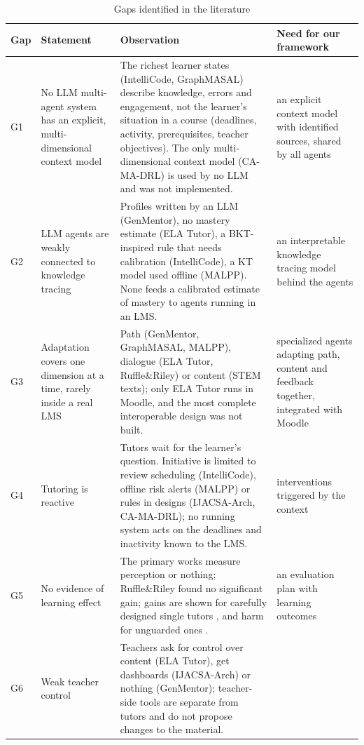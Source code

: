 \begin{table}[htbp]
\centering
\caption{Gaps identified in the literature}
\label{tab-gaps}
\scriptsize
\begin{tabularx}{\textwidth}{@{}L{0.7cm}L{3.3cm}YL{3.0cm}@{}}
\toprule
\textbf{Gap} & \textbf{Statement} & \textbf{Observation} & \textbf{Need for our framework} \\
\midrule
G1 & No LLM multi-agent system has an explicit, multi-dimensional context model &
  The richest learner states (IntelliCode, GraphMASAL) describe knowledge, errors and engagement, not the learner's situation in a course (deadlines, activity, prerequisites, teacher objectives). The only multi-dimensional context model (CA-MA-DRL) is used by no LLM and was not implemented. &
  an explicit context model with identified sources, shared by all agents \\
G2 & LLM agents are weakly connected to knowledge tracing &
  Profiles written by an LLM (GenMentor), no mastery estimate (ELA Tutor), a BKT-inspired rule that needs calibration (IntelliCode), a KT model used offline (MALPP). None feeds a calibrated estimate of mastery to agents running in an LMS. &
  an interpretable knowledge tracing model behind the agents \\
G3 & Adaptation covers one dimension at a time, rarely inside a real LMS &
  Path (GenMentor, GraphMASAL, MALPP), dialogue (ELA Tutor, Ruffle\&Riley) or content (STEM texts); only ELA Tutor runs in Moodle, and the most complete interoperable design was not built. &
  specialized agents adapting path, content and feedback together, integrated with Moodle \\
G4 & Tutoring is reactive &
  Tutors wait for the learner's question. Initiative is limited to review scheduling (IntelliCode), offline risk alerts (MALPP) or rules in designs (IJACSA-Arch, CA-MA-DRL); no running system acts on the deadlines and inactivity known to the LMS. &
  interventions triggered by the context \\
G5 & No evidence of learning effect &
  The primary works measure perception or nothing; Ruffle\&Riley found no significant gain; gains are shown for carefully designed single tutors \cite{kestin2025}, and harm for unguarded ones \cite{bastani2025}. &
  an evaluation plan with learning outcomes \\
G6 & Weak teacher control &
  Teachers ask for control over content (ELA Tutor), get dashboards (IJACSA-Arch) or nothing (GenMentor); teacher-side tools are separate from tutors and do not propose changes to the material. &

\end{tabularx}
\end{table}
